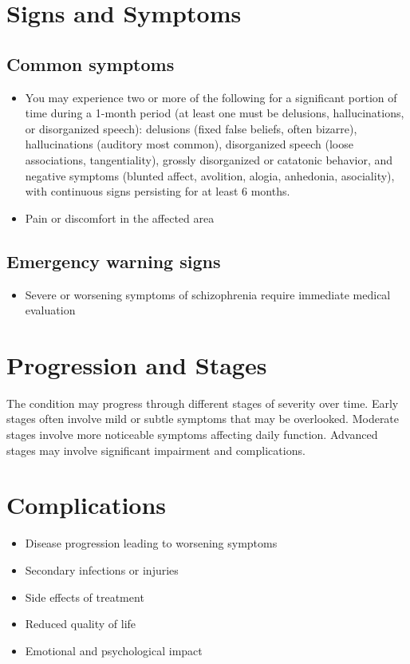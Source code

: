 \section{Signs and Symptoms}
\subsection{Common symptoms}
\begin{itemize}[noitemsep]
  \item You may experience two or more of the following for a significant portion of time during a 1-month period (at least one must be delusions, hallucinations, or disorganized speech): delusions (fixed false beliefs, often bizarre), hallucinations (auditory most common), disorganized speech (loose associations, tangentiality), grossly disorganized or catatonic behavior, and negative symptoms (blunted affect, avolition, alogia, anhedonia, asociality), with continuous signs persisting for at least 6 months.
  \item Pain or discomfort in the affected area
  \end{itemize}
\subsection{Emergency warning signs}
\begin{itemize}[noitemsep]
  \item Severe or worsening symptoms of schizophrenia require immediate medical evaluation
\end{itemize}
\section{Progression and Stages}
The condition may progress through different stages of severity over time. Early stages often involve mild or subtle symptoms that may be overlooked. Moderate stages involve more noticeable symptoms affecting daily function. Advanced stages may involve significant impairment and complications.
\section{Complications}
\begin{itemize}[noitemsep]
  \item Disease progression leading to worsening symptoms
  \item Secondary infections or injuries
  \item Side effects of treatment
  \item Reduced quality of life
  \item Emotional and psychological impact
\end{itemize}
